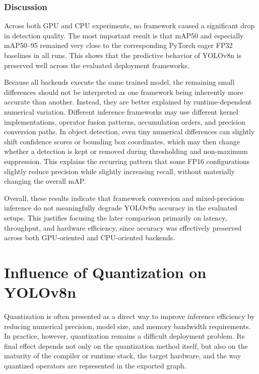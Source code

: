 \documentclass[12pt,a4paper]{report}
\begin{document}
\subsubsection{Discussion}

Across both GPU and CPU experiments, no framework caused a significant drop in detection quality. The most important
result is that mAP50 and especially mAP50--95 remained very close to the corresponding PyTorch eager FP32 baselines
in all runs. This shows that the predictive behavior of YOLOv8n is preserved well across
the evaluated deployment frameworks.

Because all backends execute the same trained model, the remaining small differences should not be interpreted
as one framework being inherently more accurate than another. Instead, they are better explained by runtime-dependent
numerical variation. Different inference frameworks may use different kernel implementations, operator fusion patterns,
accumulation orders, and precision conversion paths. In object detection, even tiny numerical differences can slightly
shift confidence scores or bounding box coordinates, which may then change whether a detection is kept or removed
during thresholding and non-maximum suppression. This explains the recurring pattern that some FP16 configurations
slightly reduce precision while slightly increasing recall, without materially changing the overall mAP.

Overall, these results indicate that framework conversion and mixed-precision inference do not meaningfully
degrade YOLOv8n accuracy in the evaluated setups. This justifies focusing the later comparison primarily on latency,
throughput, and hardware efficiency, since accuracy was effectively preserved across both GPU-oriented and
CPU-oriented backends.


\section{Influence of Quantization on YOLOv8n}
\label{sec:quantization_yolov8n}

Quantization is often presented as a direct way to improve inference efficiency by reducing numerical precision,
model size, and memory bandwidth requirements. In practice, however, quantization remains a difficult deployment
problem. Its final effect depends not only on the quantization method itself, but also on the maturity of the
compiler or runtime stack, the target hardware, and the way quantized operators are represented in the exported
graph.
\end{document}
